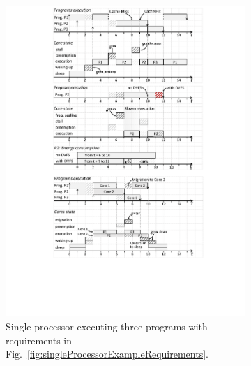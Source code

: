 \begin{figure}
\begin{minipage}{.75\columnwidth}%
\begin{subfigure}[t]{\linewidth}
\includegraphics[width=\linewidth]{figs/singleProcessorExecutionExample.pdf}
\caption{Single processor executing three programs with requirements in Fig.~\ref{fig:singleProcessorExampleRequirements}.}
\vspace{3mm}
\label{fig:singleProcessorExecutionExample}
\end{subfigure}
\begin{subfigure}[t]{\linewidth}

\end{subfigure}
\end{minipage}
\end{figure}
